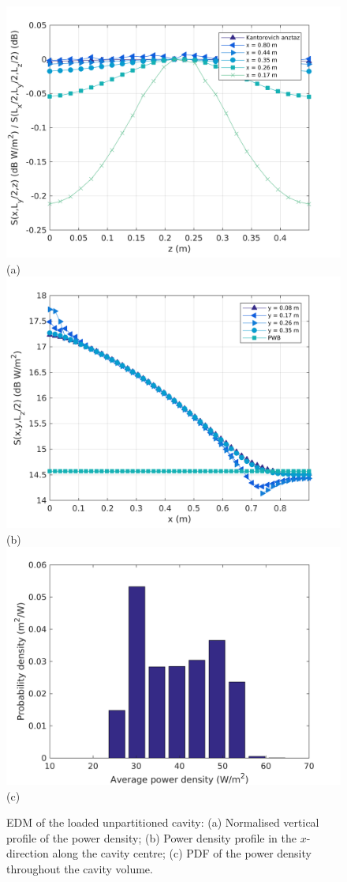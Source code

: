 \documentclass[a4paper]{article}
\numberwithin{equation}{section}
\begin{document}
\begin{figure}[hp]
\begin{center}
\includegraphics[width=0.6\linewidth]{figures/SDM_3D_SL_PowerDensityProfileZ}\\
{\footnotesize (a)}\\
\vspace{2mm}
\includegraphics[width=0.6\linewidth]{figures/SDM_3D_SL_PowerDensityProfileX}\\
{\footnotesize (b)}\\
\vspace{2mm}
\includegraphics[width=0.6\linewidth]{figures/SDM_3D_SL_PowerDensityPDF}\\
{\footnotesize (c)}\\
\vspace{-2mm}
\caption{\label{fg:unpartcyl_profs} EDM of the loaded unpartitioned cavity: (a) Normalised vertical profile of the power density; 
(b) Power density profile in the $x$-direction along the cavity centre; (c) PDF of the power density throughout the cavity volume.}
\end{center}
\end{figure}
\end{document}
